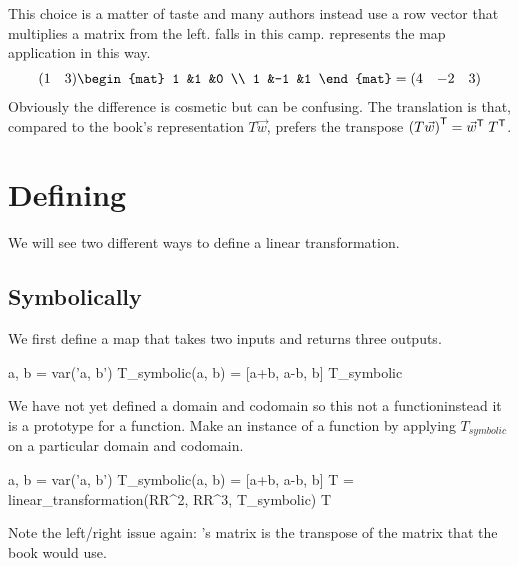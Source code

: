 This choice is a matter of taste and many authors instead
use a row vector that multiplies a matrix from the left.
\Sage{} falls in this camp.
\Sage{} represents the map application in this way.
\begin{equation*}
  \rowvec{1 &3}
  \begin{mat}
    1 &1  &0 \\
    1 &-1 &1
  \end{mat}
  =
  \rowvec{4 &-2 &3}
\end{equation*}
Obviously the difference is cosmetic but can be confusing.
The translation is that, compared to the book's representation $T\vec{w}$,
\Sage{} prefers the transpose
${{(T\vec{w})}^{\textsf{T}}}={{\vec{w}}^{\textsf{T}}}\;{{T}^{\textsf{T}}}$.



  

\section{Defining}
We will see two different ways to define a linear transformation.

\subsection{Symbolically}
We first define a map that takes two inputs and returns three outputs.
\begin{sageoutput}
a, b = var('a, b')   
T_symbolic(a, b) = [a+b, a-b, b]         
T_symbolic       
\end{sageoutput}
We have not yet defined a domain and codomain 
so this not a function\Dash instead it is a prototype for a function.
Make an instance of a function by applying $T_{\textit{symbolic}}$ on a 
particular domain and codomain.
\begin{sageoutput}[d,0,2;s,7,68,60;s,8,70,60]
a, b = var('a, b')   
T_symbolic(a, b) = [a+b, a-b, b]         
T = linear_transformation(RR^2, RR^3, T_symbolic)
T                                              
\end{sageoutput}
\noindent Note the left/right issue again: \Sage's matrix is the transpose of
the matrix that the book would use.

